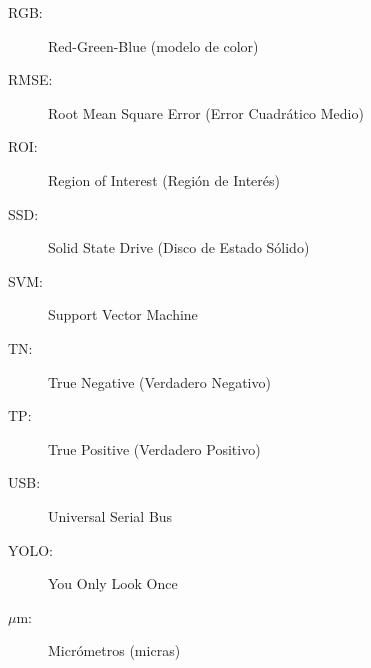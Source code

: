 \begin{description}
    \item[RGB:] Red-Green-Blue (modelo de color)
    \item[RMSE:] Root Mean Square Error (Error Cuadrático Medio)
    \item[ROI:] Region of Interest (Región de Interés)
    \item[SSD:] Solid State Drive (Disco de Estado Sólido)
    \item[SVM:] Support Vector Machine
    \item[TN:] True Negative (Verdadero Negativo)
    \item[TP:] True Positive (Verdadero Positivo)
    \item[USB:] Universal Serial Bus
    \item[YOLO:] You Only Look Once
    \item[$\mu$m:] Micrómetros (micras)
\end{description}

